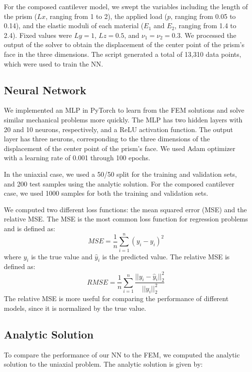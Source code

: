 \documentclass[oneside,a4paper,english,links]{amca}
\begin{document}
For the composed cantilever model, we swept the variables including the length of the prism ($Lx$, ranging from 1 to 2), the applied load ($p$, ranging from 0.05 to 0.14), and the elastic moduli of each material ($E_1$ and $E_2$, ranging from 1.4 to 2.4). Fixed values were $Ly=1$, $Lz=0.5$, and $\nu_1=\nu_2=0.3$. We processed the output of the solver to obtain the displacement of the center point of the prism's face in the three dimensions. The script generated a total of 13,310 data points, which were used to train the NN.

\subsection{Neural Network}
We implemented an MLP in PyTorch to learn from the FEM solutions and solve similar mechanical problems more quickly. The MLP has two hidden layers with 20 and 10 neurons, respectively, and a ReLU activation function. The output layer has three neurons, corresponding to the three dimensions of the displacement of the center point of the prism's face. We used Adam optimizer with a learning rate of 0.001 through 100 epochs.

In the uniaxial case, we used a 50/50 split for the training and validation sets, and 200 test samples using the analytic solution. For the composed cantilever case, we used 1000 samples for both the training and validation sets.

We computed two different loss functions: the mean squared error (MSE) and the relative MSE. The MSE is the most common loss function for regression problems and is defined as:
\begin{equation}
\label{eq:MSE}
MSE = \frac{1}{n} \sum_{i=1}^{n} (y_i - \hat{y}_i)^2
\end{equation}
where $y_i$ is the true value and $\hat{y}_i$ is the predicted value. The relative MSE is defined as:
\begin{equation}
\label{eq:RMSE}
RMSE = \frac{1}{n} \sum_{i=1}^{n} \frac{||y_i - \hat{y}_i||_2^2}{||y_i||_2^2}
\end{equation}
The relative MSE is more useful for comparing the performance of different models, since it is normalized by the true value.

\subsection{Analytic Solution}
To compare the performance of our NN to the FEM, we computed the analytic solution to the uniaxial problem. The analytic solution is given by:
\end{document}
